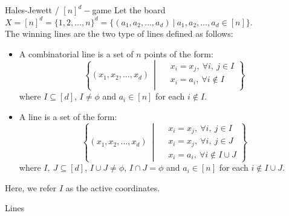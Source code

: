 \documentclass[12pt]{article}
\begin{document}
\begin{definition}[label = nd-game]{Hales-Jewett / $[n]^d-$game}
    Let the board $X = [n]^d = \{1, 2, \hdots, n\}^d = \{(a_1, a_2, \hdots, a_d) ~|~ a_1, a_2, \hdots, a_d \in [n]\}$. \\
    The winning lines are the two type of lines defined as follows:
    \begin{itemize}
        \item A combinatorial line is a set of \(n\) points of the form:
        \[\left\{(x_1, x_2, \hdots, x_d) ~\middle|~ 
        \begin{aligned}
      &x_i = x_j, ~\forall i, ~j \in I\\
      &x_i = a_i, ~\forall i \notin I\\
    \end{aligned}\right\}\]
    where $I \subseteq [d]$, $I \neq \phi$ and $a_i \in [n]$ for each $i \notin I$.
    \item A line is a set of the form:
    \[\left\{(x_1, x_2, \hdots, x_d) ~\middle|~ 
        \begin{aligned}
      &x_i = x_j, ~\forall i, ~j \in I\\
      &x_i = x_j, ~\forall i, ~j \in J\\
      &x_i = a_i, ~\forall i \notin I \cup J
    \end{aligned}\right\}\]
    where $I, ~J \subseteq [d]$, $I \cup J \neq \phi$, $I \cap J = \phi$ and $a_i \in [n]$ for each $i \notin I \cup J$.
    \end{itemize}
\end{definition}

Here, we refer $I$ as the active coordinates.

\begin{example}{Lines}
    
\end{example}
\end{document}
